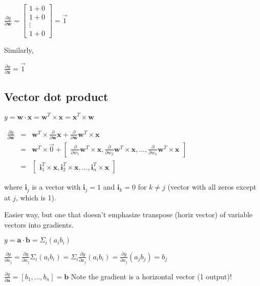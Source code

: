 \documentclass[11pt]{article}
\begin{document}
$\frac{\partial y}{\partial \mathbf{w}} = \begin{bmatrix}
           1 + 0 \\
           1 + 0\\
           \vdots \\
           1 + 0
         \end{bmatrix} = \vec{1}$

Similarly,

$\frac{\partial y}{\partial \mathbf{x}} = \vec{1}$

\subsection{Vector dot product}

$y = \mathbf{w} \cdot \mathbf{x} = \mathbf{w}^{T} \times \mathbf{x} = \mathbf{x}^{T} \times \mathbf{w}$

$
\begin{array}{rcl}
\frac{\partial y}{\partial \mathbf{w}} & = & \mathbf{w}^{T} \times \frac{\partial}{\partial \mathbf{w}}\mathbf{x} + \frac{\partial}{\partial \mathbf{w}}\mathbf{w}^{T} \times \mathbf{x} \\
 & = & \mathbf{w}^{T} \times \vec{0} + \begin{bmatrix} \frac{\partial}{\partial w_1}\mathbf{w}^{T} \times \mathbf{x}, \frac{\partial}{\partial w_2}\mathbf{w}^{T} \times \mathbf{x}, \ldots, \frac{\partial}{\partial w_n}\mathbf{w}^{T} \times \mathbf{x} \end{bmatrix}\\
 & = & \begin{bmatrix} \mathbf{i}_1^T \times \mathbf{x}, \mathbf{i}_2^T \times \mathbf{x}, \dots, \mathbf{i}_n^T \times \mathbf{x}\end{bmatrix}
\end{array}
$

where $\mathbf{i}_j$ is a vector with $\mathbf{i}_j=1$ and $\mathbf{i}_k=0$ for $k \neq j$ (vector with all zeros except at $j$, which is 1).

Easier way, but one that doesn't emphasize transpose (horiz vector) of variable vectors into gradients.

$y = \mathbf{a} \cdot \mathbf{b} = \Sigma_i (a_i b_i)$

$\frac{\partial y}{\partial a_j} = \frac{\partial y}{\partial a_j} \Sigma_i (a_i b_i) = \Sigma_i \frac{\partial y}{\partial a_j} (a_i b_i) = \frac{\partial y}{\partial a_j} (a_j b_j) = b_j$

$\frac{\partial y}{\partial \mathbf{a}} = [ b_1, \ldots, b_n ] = \mathbf{b}$ Note the gradient is a horizontal vector (1 output)!
\end{document}
